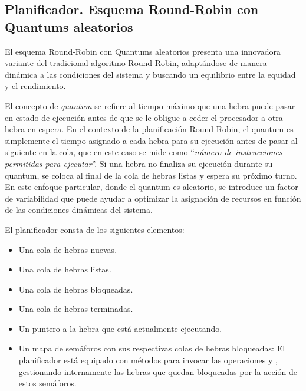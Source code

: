 \newpage

\subsection{Planificador. Esquema Round-Robin con Quantums aleatorios}
El esquema Round-Robin con Quantums aleatorios presenta una innovadora variante del tradicional algoritmo Round-Robin, adaptándose de manera dinámica a las condiciones del sistema y buscando un equilibrio entre la equidad y el rendimiento.



El concepto de \textit{quantum} se refiere al tiempo máximo que una hebra puede pasar en estado de ejecución antes de que se le obligue a ceder el procesador a otra hebra en espera. En el contexto de la planificación Round-Robin, el quantum es simplemente el tiempo asignado a cada hebra para su ejecución antes de pasar al siguiente en la cola, que en este caso se mide como ``\textit{número de instrucciones permitidas para ejecutar}''. Si una hebra no finaliza su ejecución durante su quantum, se coloca al final de la cola de hebras listas y espera su próximo turno. En este enfoque particular, donde el quantum es aleatorio, se introduce un factor de variabilidad que puede ayudar a optimizar la asignación de recursos en función de las condiciones dinámicas del sistema.



\noindent
El planificador consta de los siguientes elementos:
\begin{itemize}
    \item Una cola de hebras nuevas.
    \item Una cola de hebras listas.
    \item Una cola de hebras bloqueadas.
    \item Una cola de hebras terminadas.
    \item Un puntero a la hebra que está actualmente ejecutando.
    \item Un mapa de semáforos con sus respectivas colas de hebras bloqueadas: El planificador está equipado con métodos para invocar las operaciones  y , gestionando internamente las hebras que quedan bloqueadas por la acción de estos semáforos.
\end{itemize}



